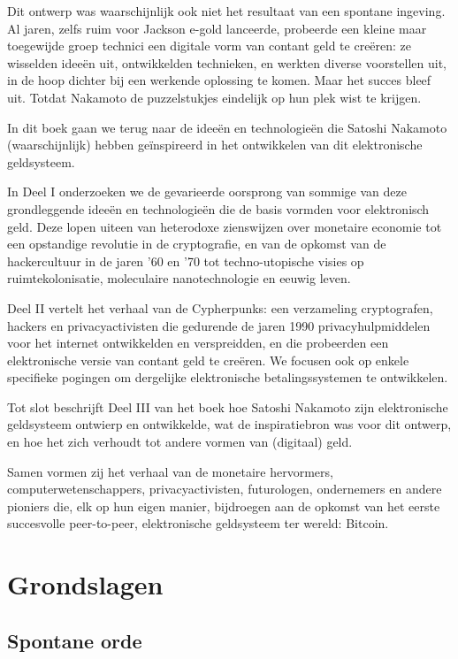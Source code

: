 \documentclass[
  a5paper,
  smalldemyvopaper,11pt,twoside,onecolumn,openright,extrafontsizes,
hidelinks]{memoir}
\begin{document}
Dit ontwerp was waarschijnlijk ook niet het resultaat van een spontane
ingeving. Al jaren, zelfs ruim voor Jackson e-gold lanceerde, probeerde
een kleine maar toegewijde groep technici een digitale vorm van contant
geld te creëren: ze wisselden ideeën uit, ontwikkelden technieken, en
werkten diverse voorstellen uit, in de hoop dichter bij een werkende
oplossing te komen. Maar het succes bleef uit. Totdat Nakamoto de
puzzelstukjes eindelijk op hun plek wist te krijgen.

In dit boek gaan we terug naar de ideeën en technologieën die Satoshi
Nakamoto (waarschijnlijk) hebben geïnspireerd in het ontwikkelen van dit
elektronische geldsysteem.

In Deel I onderzoeken we de gevarieerde oorsprong van sommige van deze
grondleggende ideeën en technologieën die de basis vormden voor
elektronisch geld. Deze lopen uiteen van heterodoxe zienswijzen over
monetaire economie tot een opstandige revolutie in de cryptografie, en
van de opkomst van de hackercultuur in de jaren '60 en '70 tot
techno-utopische visies op ruimtekolonisatie, moleculaire
nanotechnologie en eeuwig leven.

Deel II vertelt het verhaal van de Cypherpunks: een verzameling
cryptografen, hackers en privacyactivisten die gedurende de jaren 1990
privacyhulpmiddelen voor het internet ontwikkelden en verspreidden, en
die probeerden een elektronische versie van contant geld te creëren. We
focusen ook op enkele specifieke pogingen om dergelijke elektronische
betalingssystemen te ontwikkelen.

Tot slot beschrijft Deel III van het boek hoe Satoshi Nakamoto zijn
elektronische geldsysteem ontwierp en ontwikkelde, wat de inspiratiebron
was voor dit ontwerp, en hoe het zich verhoudt tot andere vormen van
(digitaal) geld.

Samen vormen zij het verhaal van de monetaire hervormers,
computerwetenschappers, privacyactivisten, futurologen, ondernemers en
andere pioniers die, elk op hun eigen manier, bijdroegen aan de opkomst
van het eerste succesvolle peer-to-peer, elektronische geldsysteem ter
wereld: Bitcoin.

\part{Grondslagen}

\chapter{Spontane orde}\label{spontane-orde}
\end{document}
